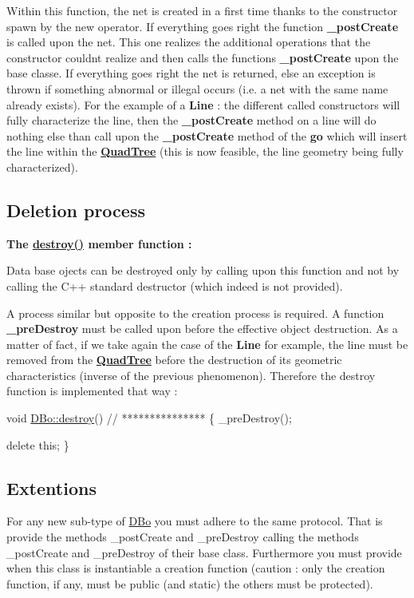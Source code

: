 Within this function, the net is created in a first time thanks to the constructor spawn by the new operator. If everything goes right the function {\bfseries \+\_\+post\+Create} is called upon the net. This one realizes the additional operations that the constructor couldn\textquotesingle{}t realize and then calls the functions {\bfseries \+\_\+post\+Create} upon the base classe. If everything goes right the net is returned, else an exception is thrown if something abnormal or illegal occurs (i.\+e. a net with the same name already exists). For the example of a {\bfseries Line} \+: the different called constructors will fully characterize the line, then the {\bfseries \+\_\+post\+Create} method on a line will do nothing else than call upon the {\bfseries \+\_\+post\+Create} method of the {\bfseries go} which will insert the line within the {\bfseries \hyperlink{classHurricane_1_1QuadTree}{Quad\+Tree}} (this is now feasible, the line geometry being fully characterized).\hypertarget{classHurricane_1_1DBo_sDBodestroy}{}\subsection{Deletion process}\label{classHurricane_1_1DBo_sDBodestroy}
{\bfseries The \hyperlink{classHurricane_1_1DBo_a67febf5bf9c8b322674648688639728b}{destroy()} member function \+:}

Data base ojects can be destroyed only by calling upon this function and not by calling the C++ standard destructor (which indeed is not provided).

A process similar but opposite to the creation process is required. A function {\bfseries \+\_\+pre\+Destroy} must be called upon before the effective object destruction. As a matter of fact, if we take again the case of the {\bfseries Line} for example, the line must be removed from the {\bfseries \hyperlink{classHurricane_1_1QuadTree}{Quad\+Tree}} before the destruction of its geometric characteristics (inverse of the previous phenomenon). Therefore the destroy function is implemented that way \+: 
\begin{DoxyCode}
\textcolor{keywordtype}{void} \hyperlink{classHurricane_1_1DBo_a67febf5bf9c8b322674648688639728b}{DBo::destroy}()
\textcolor{comment}{// ***************}
\{
  \_preDestroy();
                
  \textcolor{keyword}{delete} \textcolor{keyword}{this};
\}
\end{DoxyCode}
\hypertarget{classHurricane_1_1DBo_sDBoExtentions}{}\subsection{Extentions}\label{classHurricane_1_1DBo_sDBoExtentions}
For any new sub-\/type of \hyperlink{classHurricane_1_1DBo}{D\+Bo} you must adhere to the same protocol. That is provide the methods \+\_\+post\+Create and \+\_\+pre\+Destroy calling the methods \+\_\+post\+Create and \+\_\+pre\+Destroy of their base class. Furthermore you must provide when this class is instantiable a creation function (caution \+: only the creation function, if any, must be {\ttfamily public} (and {\ttfamily static}) the others must be {\ttfamily protected}).

